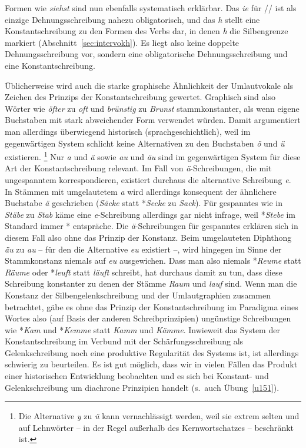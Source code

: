 Formen wie \textit{siehst} sind nun ebenfalls systematisch erklärbar.
Das \textit{ie} für // ist als einzige Dehnungsschreibung nahezu obligatorisch, und das \textit{h} stellt eine Konstantschreibung zu den Formen des Verbs dar, in denen \textit{h} die Silbengrenze markiert (Abschnitt~\ref{sec:intervokh}).
Es liegt also keine doppelte Dehnungsschreibung vor, sondern eine obligatorische Dehnungsschreibung und eine Konstantschreibung.

Üblicherweise wird auch die starke graphische Ähnlichkeit der Umlautvokale als Zeichen des Prinzips der Konstantschreibung gewertet.
Graphisch sind also Wörter wie \textit{öfter} zu \textit{oft} und \textit{brünstig} zu \textit{Brunst} stammkonstanter, als wenn eigene Buchstaben mit stark abweichender Form verwendet würden.
Damit argumentiert man allerdings überwiegend historisch (sprachgeschichtlich), weil im gegenwärtigen System schlicht keine Alternativen zu den Buchstaben \textit{ö} und \textit{ü} existieren.%
\footnote{Die Alternative \textit{y} zu \textit{ü} kann vernachlässigt werden, weil sie extrem selten und auf Lehnwörter -- in der Regel außerhalb des Kernwortschatzes -- beschränkt ist.}
Nur \textit{a} und \textit{ä} sowie \textit{au} und \textit{äu} sind im gegenwärtigen System für diese Art der Konstantschreibung relevant.
Im Fall von \textit{ä}-Schreibungen, die mit ungespanntem \textipa{[E]} korrespondieren, existiert durchaus die alternative Schreibung \textit{e}.
In Stämmen mit umgelautetem \textit{a} wird allerdings konsequent der ähnlichere Buchstabe \textit{ä} geschrieben (\textit{Säcke} statt *\textit{Secke} zu \textit{Sack}).
Für gespanntes \textipa{[E:]} wie in \textit{Stäbe} \textipa{[StE:b@]} zu \textit{Stab} \textipa{[Sta:p]} käme eine \textit{e}-Schreibung allerdings gar nicht infrage, weil *\textit{Stebe} im Standard immer *\textipa{[Ste:b@]} entspräche.
Die \textit{ä}-Schreibungen für gespanntes \textipa{[E:]} erklären sich in diesem Fall also ohne das Prinzip der Konstanz.
Beim umgelauteten Diphthong \textit{äu} \textipa{[\t{O\oe}]} zu \textit{au} -- für den die Alternative \textit{eu} existiert --, wird hingegen im Sinne der Stammkonstanz niemals auf \textit{eu} ausgewichen.
Dass man also niemals *\textit{Reume} statt \textit{Räume} oder *\textit{leuft} statt \textit{läuft} schreibt, hat durchaus damit zu tun, dass diese Schreibung konstanter zu denen der Stämme \textit{Raum} und \textit{lauf} sind.
Wenn man die Konstanz der Silbengelenkschreibung und der Umlautgraphien zusammen betrachtet, gäbe es ohne das Prinzip der Konstantschreibung im Paradigma eines Wortes also (auf Basis der anderen Schreibprinzipien) ungünstige Schreibungen wie *\textit{Kam} und *\textit{Kemme} statt \textit{Kamm} und \textit{Kämme}.
Inwieweit das System der Konstantschreibung im Verbund mit der Schärfungsschreibung als Gelenkschreibung noch eine produktive Regularität des Systems ist, ist allerdings schwierig zu beurteilen.
Es ist gut möglich, dass wir in vielen Fällen das Produkt einer historischen Entwicklung beobachten und es sich bei Konstant- und Gelenkschreibung um diachrone Prinzipien handelt (s.\ auch Übung~\ref{u151}).


